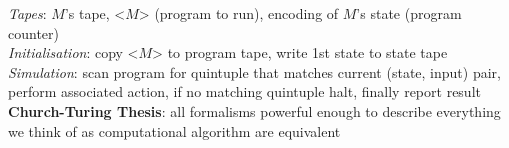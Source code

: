 \documentclass[a4paper]{article}
\begin{document}
\begin{multicols}{2}
        \textit{Tapes}: $M$'s tape, <$M$> (program to run), encoding of $M$'s state (program counter)\\
        \textit{Initialisation}: copy <$M$> to program tape, write 1st state to state tape\\
        \textit{Simulation}: scan program for quintuple that matches current (state, input) pair, perform associated action, if no matching quintuple halt, finally report result\\
        \textbf{Church-Turing Thesis}: all formalisms powerful enough to describe everything we think of as computational algorithm are equivalent\\
    \end{multicols}
    
\end{document}
